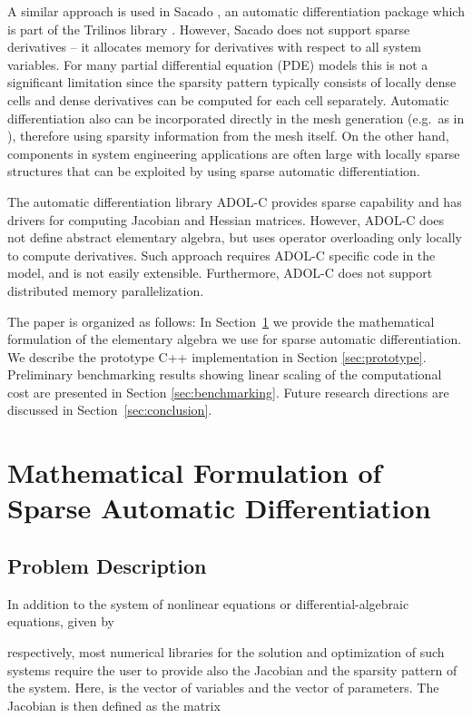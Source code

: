 \documentclass[10pt]{ijnam}
\theoremstyle{definition}
\begin{document}
A similar approach is used in Sacado \cite{phipps2012}, an automatic differentiation
package which is part of the Trilinos library \cite{heroux2005}. However, Sacado does 
not support sparse derivatives -- it allocates memory for derivatives 
with respect to all system variables. 
For many partial differential equation (PDE) models this is not a significant limitation since the
sparsity pattern typically consists of locally dense cells and dense derivatives can be computed 
for each cell separately.
Automatic differentiation also can be incorporated directly in the mesh generation 
(e.g.~as in \cite{schoberl2014}), therefore using sparsity information from the mesh itself. 
On the other hand, components in system engineering applications are often large with locally sparse structures that can be exploited by using sparse automatic differentiation.

The automatic differentiation library ADOL-C \cite{walther2012} provides sparse
capability and has drivers for computing Jacobian and Hessian matrices. However, ADOL-C  does 
not define abstract elementary algebra, but uses operator overloading only locally to compute 
derivatives. Such approach requires ADOL-C specific code in the model, and is not easily extensible. 
Furthermore, ADOL-C does not support distributed memory parallelization.

The paper is organized as follows: In Section~\ref{sec:ad} we provide the mathematical
formulation of the elementary algebra we use for sparse automatic differentiation. We
describe the prototype C++ implementation in Section \ref{sec:prototype}. Preliminary 
benchmarking results showing linear scaling of the computational cost 
are presented in Section \ref{sec:benchmarking}. Future 
research directions are discussed in Section~\ref{sec:conclusion}.

\section{Mathematical Formulation of Sparse Automatic Differentiation}
\label{sec:ad}

\subsection{Problem Description}

In addition to the system of nonlinear equations or differential-algebraic equations, given by

respectively, most numerical libraries for the solution and optimization of such systems require the user to provide also the Jacobian and the sparsity pattern of the system. Here,  is the vector of variables and  the vector of parameters. The Jacobian  is then defined as the matrix
\end{document}
